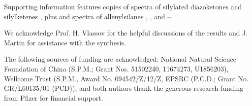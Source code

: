 \documentclass[]{beilstein}
\newcommand*{\HNMR}{\chem{^{1}H~NMR}\xspace}
\newcommand*{\CNMR}{\chem{^{13}C~NMR}\xspace}
\begin{document}
\begin{suppinfo}
Supporting information features copies of \HNMR spectra of silylated diazoketones  and silylketenes , plus  and \CNMR spectra of allenylsilanes , , and --.
\label{si:1}
\end{suppinfo}

\begin{acknowledgements}
We acknowledge Prof. H. Vlassov for the helpful discussions of the results and J. Martin for assistance with the synthesis.
\end{acknowledgements}

\begin{funding}
The following sources of funding are acknowledged: National Natural Science Foundation of China (S.P.M.; Grant Nos. 51502240, 11674273, U1856203), Wellcome Trust (S.P.M., Award No. 094542/Z/12/Z, EPSRC (P.C.D.; Grant No. GR/L60135/01 (PCD)), and both authors thank the generous research funding from Pfizer for financial support.
\end{funding}



\end{document}
